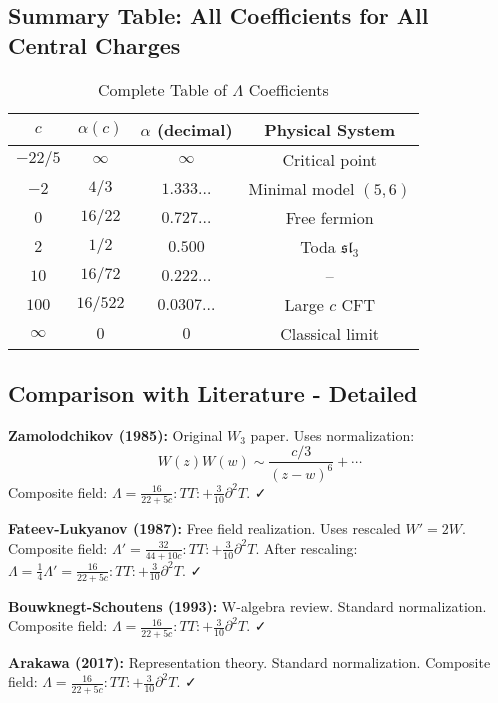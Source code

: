 \subsection{Summary Table: All Coefficients for All Central Charges}
\label{subsec:all-coefficients-table}

\begin{table}[h]
\centering
\caption{Complete Table of $\Lambda$ Coefficients}
\label{tab:lambda-all-values}
\begin{tabular}{|c|c|c|c|}
\hline
\textbf{$c$} & \textbf{$\alpha(c)$} & \textbf{$\alpha$ (decimal)} & 
\textbf{Physical System} \\
\hline
$-22/5$ & $\infty$ & $\infty$ & Critical point \\
\hline
$-2$ & $4/3$ & $1.333\ldots$ & Minimal model $(5,6)$ \\
\hline
$0$ & $16/22$ & $0.727\ldots$ & Free fermion \\
\hline
$2$ & $1/2$ & $0.500$ & Toda $\mathfrak{sl}_3$ \\
\hline
$10$ & $16/72$ & $0.222\ldots$ & -- \\
\hline
$100$ & $16/522$ & $0.0307\ldots$ & Large $c$ CFT \\
\hline
$\infty$ & $0$ & $0$ & Classical limit \\
\hline
\end{tabular}
\end{table}

\subsection{Comparison with Literature - Detailed}

\textbf{Zamolodchikov (1985):} Original $W_3$ paper. Uses normalization:
$$W(z)W(w) \sim \frac{c/3}{(z-w)^6} + \cdots$$
Composite field: $\Lambda = \frac{16}{22+5c}:TT: + \frac{3}{10}\partial^2 T$. ✓

\textbf{Fateev-Lukyanov (1987):} Free field realization. Uses rescaled $W' = 2W$.
Composite field: $\Lambda' = \frac{32}{44+10c}:TT: + \frac{3}{10}\partial^2 T$.
After rescaling: $\Lambda = \frac{1}{4}\Lambda' = \frac{16}{22+5c}:TT: + \frac{3}{10}\partial^2 T$. ✓

\textbf{Bouwknegt-Schoutens (1993):} W-algebra review. Standard normalization.
Composite field: $\Lambda = \frac{16}{22+5c}:TT: + \frac{3}{10}\partial^2 T$. ✓

\textbf{Arakawa (2017):} Representation theory. Standard normalization.
Composite field: $\Lambda = \frac{16}{22+5c}:TT: + \frac{3}{10}\partial^2 T$. ✓

